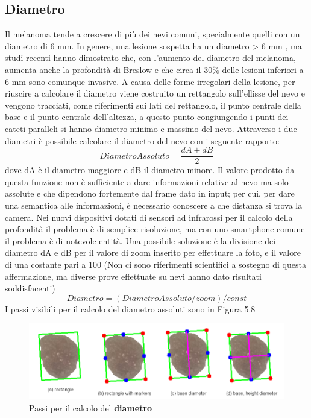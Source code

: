 \subsection{Diametro}
Il melanoma tende a crescere di più dei nevi comuni, specialmente quelli con un diametro di 6 mm.
In genere, una lesione sospetta ha un diametro > 6 mm \cite{rigel2010evolution}, ma studi recenti hanno dimostrato che, con l'aumento del diametro del melanoma, aumenta anche la profondità di Breslow e che circa il 30\% delle lesioni inferiori a 6 mm sono comunque invasive.
A causa delle forme irregolari della lesione, per riuscire a calcolare il diametro viene costruito un rettangolo sull'ellisse del nevo e vengono tracciati, come riferimenti sui lati del rettangolo, il punto centrale della base e il punto centrale dell'altezza, a questo punto congiungendo i punti dei cateti paralleli si hanno diametro minimo e massimo del nevo.
\newline
Attraverso i due diametri è possibile calcolare il diametro del nevo con i seguente rapporto:
\begin{equation}
	Diametro Assoluto=\frac{dA+dB}{2}
\end{equation}
dove dA è il diametro maggiore e dB il diametro minore.
\newline
Il valore prodotto da questa funzione non è sufficiente a dare informazioni relative al nevo ma solo assolute e che dipendono fortemente dal frame dato in input; per cui, per dare una semantica alle informazioni, è necessario conoscere a che distanza si trova la camera.
\newline
Nei nuovi dispositivi dotati di sensori ad infrarossi per il calcolo della profondità il problema è di semplice risoluzione, ma con uno smartphone comune il problema è di notevole entità.
\newline
Una possibile soluzione è la divisione dei diametro dA e dB per il valore di zoom inserito per effettuare la foto, e il valore di una costante pari a 100 (Non ci sono riferimenti scientifici a sostegno di questa affermazione, ma diverse prove effettuate su nevi hanno dato risultati soddisfacenti)
\begin{equation}
	Diametro=(Diametro Assoluto/zoom)/const
\end{equation}
I passi visibili per il calcolo del diametro assoluti sono in Figura 5.8
	\begin{figure}[h]
	\begin{center}
		\includegraphics[scale=0.47]{figure/capitolo6/diameter.png}
	\end{center}
	\caption{Passi per il calcolo del \textbf{diametro}}	
\end{figure}
